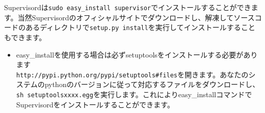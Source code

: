 Supervisordは\texttt{sudo easy\_install supervisor}でインストールすることができます。当然Supervisordのオフィシャルサイトでダウンロードし、解凍してソースコードのあるディレクトリで\texttt{setup.py install}を実行してインストールすることもできます。

\begin{itemize}
  \item easy\_installを使用する場合は必ずsetuptoolsをインストールする必要があります\\
    \texttt{http://pypi.python.org/pypi/setuptools\#files}を開きます。あなたのシステムのpythonのバージョンに従って対応するファイルをダウンロードし、\texttt{sh setuptoolsxxxx.egg}を実行します。これによりeasy\_installコマンドでSupervisordをインストールすることができます。
\end{itemize}
